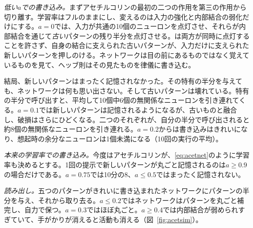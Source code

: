 \emph{低い$a$での書き込み。}まずアセチルコリンの最初の二つの作用を第三の作用から切り離す。学習率はフルのままにし、変えるのは入力の強化と内部結合の弱化だけにする。$a=0$では、入力が共通の10個のニューロンを点灯させ、それらが内部結合を通じて\emph{古い}パターンの残り半分を点灯させる。は両方が同時に点灯することを許さず、自身の結合に支えられた古いパターンが、入力だけに支えられた新しいパターンを押しのける。ネットワークは目の前にあるものではなく覚えているものを見て、ヘッブ則はその見たものを律儀に書き込む。

結局、新しいパターンはまったく記憶されなかった。その特有の半分を与えても、ネットワークは何も思い出さない。そして古いパターンは壊れている。特有の半分で呼び出すと、平均して10個中6個の無関係なニューロンを引き連れてくる。$a=0.1$では新しいパターンは記憶されるようになるが、古いものと融合し、破損はさらにひどくなる。二つのそれぞれが、自分の半分で呼び出されると約8個の無関係なニューロンを引き連れる。$a=0.2$からは書き込みはきれいになり、想起時の余分なニューロンは1個未満になる（10回の実行の平均）。

\emph{本来の学習率での書き込み。}今度はアセチルコリンが、\eqref{eq:acetnet}のように学習率も決めるとする。1回の提示で新しいパターンが丸ごと記憶されるのは$a\ge0.9$の場合だけである。$a=0.75$では10分の8、$a\le0.5$ではまったく記憶されない。

\emph{読み出し。}五つのパターンがきれいに書き込まれたネットワークにパターンの半分を与え、それから取り去る。$a\le0.2$ではネットワークはパターンを丸ごと補完し、自力で保つ。$a=0.3$ではほぼ丸ごと。$a\ge0.4$では内部結合が弱められすぎていて、手がかりが消えると活動も消える（図~\ref{fig:acetsim}）。

